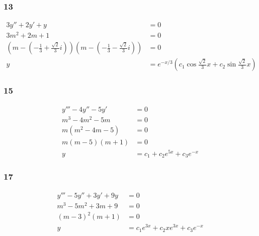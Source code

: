 \documentclass{article}
\begin{document}
\subsubsection{13}

\begin{align*}
  3y'' + 2y' + y                                                                                                    & = 0                                                                          \\
  3m^2 + 2m + 1                                                                                                     & = 0                                                                          \\
  \left( m - (-\frac{1}{3} + \frac{\sqrt{2}}{3} i) \right) \left( m - (-\frac{1}{3} - \frac{\sqrt{2}}{3} i) \right) & = 0                                                                          \\
  y                                                                                                                 & = e^{-x / 3} (c_1 \cos \frac{\sqrt{2}}{3} x + c_2 \sin \frac{\sqrt{2}}{3} x)
\end{align*}

\subsubsection{15}

\begin{align*}
  y''' - 4y'' - 5y' & = 0                             \\
  m^3 - 4m^2 - 5m   & = 0                             \\
  m (m^2 - 4m - 5)  & = 0                             \\
  m (m - 5) (m + 1) & = 0                             \\
  y                 & = c_1 + c_2 e^{5x} + c_3 e^{-x}
\end{align*}

\subsubsection{17}

\begin{align*}
  y''' - 5y'' + 3y' + 9y & = 0                                      \\
  m^3 - 5m^2 + 3m + 9    & = 0                                      \\
  (m - 3)^2 (m + 1)      & = 0                                      \\
  y                      & = c_1 e^{3x} + c_2 x e^{3x} + c_3 e^{-x}
\end{align*}
\end{document}
